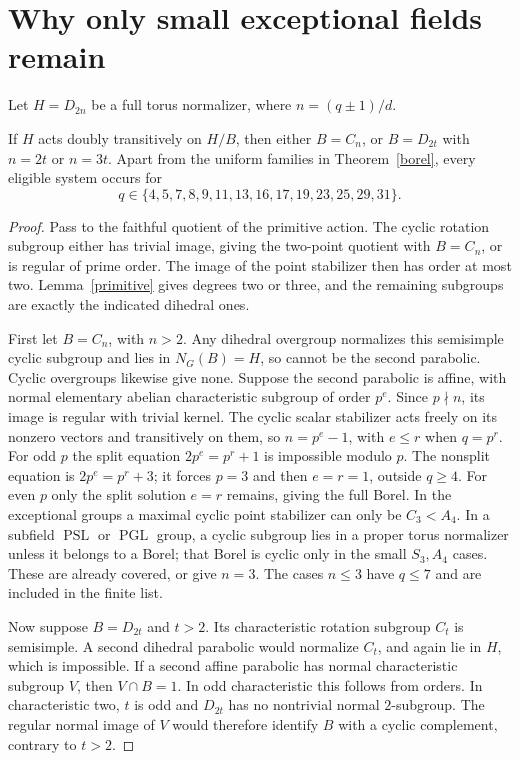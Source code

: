 \documentclass[11pt,a4paper]{article}
\newcommand{\PSL}{\operatorname{PSL}}\newcommand{\PGL}{\operatorname{PGL}}
\begin{document}
\section{Why only small exceptional fields remain}
Let $H=D_{2n}$ be a full torus normalizer, where $n=(q\pm1)/d$.

\begin{lemma}\label{dihedral}
If $H$ acts doubly transitively on $H/B$, then either $B=C_n$, or
$B=D_{2t}$ with $n=2t$ or $n=3t$. Apart from the uniform families in
Theorem~\ref{borel}, every eligible system occurs for
\[
q\in\{4,5,7,8,9,11,13,16,17,19,23,25,29,31\}.
\]
\end{lemma}
\begin{proof}
Pass to the faithful quotient of the primitive action. The cyclic rotation
subgroup either has trivial image, giving the two-point quotient with
$B=C_n$, or is regular of prime order. The image of the point stabilizer
then has order at most two. Lemma~\ref{primitive} gives degrees two or
three, and the remaining subgroups are exactly the indicated dihedral ones.

First let $B=C_n$, with $n>2$. Any dihedral overgroup normalizes this
semisimple cyclic subgroup and lies in $N_G(B)=H$, so cannot be the second
parabolic. Cyclic overgroups likewise give none. Suppose the second parabolic
is affine, with normal elementary abelian characteristic subgroup of order
$p^e$. Since $p\nmid n$, its image is regular with trivial kernel. The cyclic
scalar stabilizer acts freely on its nonzero vectors and transitively on
them, so $n=p^e-1$, with $e\le r$ when $q=p^r$. For odd $p$ the split
equation $2p^e=p^r+1$ is impossible modulo $p$. The nonsplit equation is
$2p^e=p^r+3$; it forces $p=3$ and then $e=r=1$, outside $q\ge4$.
For even $p$ only the split solution $e=r$ remains, giving the full Borel.
In the exceptional groups a maximal cyclic point stabilizer can only be
$C_3<A_4$. In a subfield $\PSL$ or $\PGL$ group, a cyclic subgroup lies
in a proper torus normalizer unless it belongs to a Borel; that Borel is
cyclic only in the small $S_3,A_4$ cases. These are already covered, or give
$n=3$. The cases $n\le3$ have $q\le7$ and are included in the finite list.

Now suppose $B=D_{2t}$ and $t>2$. Its characteristic rotation subgroup
$C_t$ is semisimple. A second dihedral parabolic would normalize $C_t$,
and again lie in $H$, which is impossible. If a second affine parabolic
has normal characteristic subgroup $V$, then $V\cap B=1$. In odd
characteristic this follows from orders. In characteristic two, $t$ is
odd and $D_{2t}$ has no nontrivial normal $2$-subgroup. The regular normal
image of $V$ would therefore identify $B$ with a cyclic complement,
contrary to $t>2$.


\end{proof}
\end{document}
